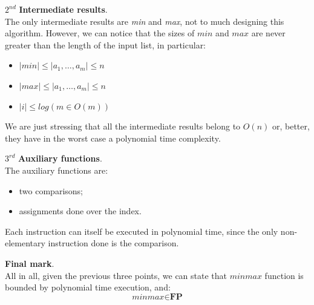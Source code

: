 \begin{example}[title = Computational task as a function]
    $2^{nd}$ \textbf{Intermediate results}. \\
    The only intermediate results are \textit{min} and \textit{max}, not to much designing this algorithm. However, we can notice that the sizes of $min$ and $max$
    are never greater than the length of the input list, in particular: \vspace{1.5pt}
    \begin{itemize}
        \renewcommand{\labelitemi}{-}
        \item $ |min| \leq |a_1, \dots, a_m| \leq n $
        \item $ |max| \leq |a_1, \dots, a_m| \leq n $
        \item $ |i| \leq log(m \in O(m)) $
    \end{itemize} \vspace{1.5pt}
    We are just stressing that all the intermediate results belong to $O(n)$ or, better, they have in the worst case a polynomial time complexity. \vspace{7pt}

    $3^{rd}$ \textbf{Auxiliary functions}. \\
    The auxiliary functions are:
    \begin{itemize}
        \renewcommand{\labelitemi}{-}
        \item two comparisons;
        \item assignments done over the index.
    \end{itemize}
    Each instruction can itself be executed in polynomial time, since the only non-elementary instruction done is the comparison. \vspace{14pt}

    \textbf{Final mark}. \\
    All in all, given the previous three points, we can state that $minmax$ function is bounded by polynomial time execution, and:
    $$ \textit{minmax} \in \textbf{FP} $$
\end{example}

